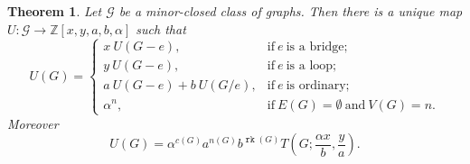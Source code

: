 \documentclass[12pt,a4paper, twoside, autooneside=false]{scrartcl}
\newtheorem{theorem}{Theorem}[section]
\theoremstyle{definition}
\theoremstyle{remark}
\numberwithin{equation}{section}
\DeclareMathOperator{\rk}{\mathtt{rk}}
\begin{document}
\begin{theorem}
Let $\mathcal{G}$ be a minor-closed class of graphs. Then there is a unique map $U : \mathcal{G} \to \mathbb{Z}[x,y,a,b,\alpha]$ such that 
\[
U(G) = \begin{cases}
x \ U(G - e), & \text{if} \ e \ \text{is a bridge}; \\
y \ U(G - e), & \text{if} \ e \ \text{is a loop}; \\
a \ U(G - e) + b \ U(G / e), & \text{if} \ e \ \text{is ordinary}; \\
\alpha^n, & \text{if} \ E(G) = \emptyset \ \text{and} \ V(G) = n.
\end{cases}
\]
Moreover 
\begin{equation} \label{(8)}
U(G) = \alpha^{c(G)} a^{n(G)} b^{\rk(G)} T\left(G; \frac{\alpha x}{b}, \frac{y}{a}\right).
\end{equation}
\end{theorem}
\end{document}
